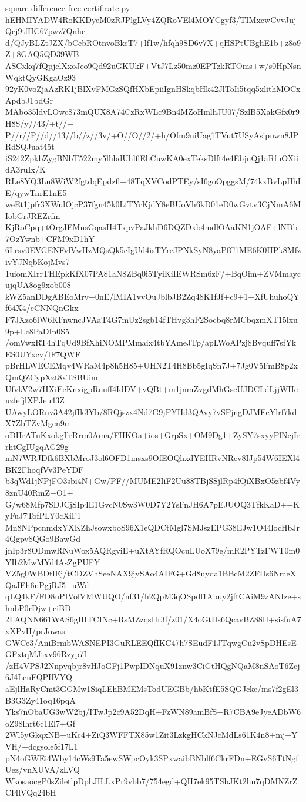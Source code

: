 \documentclass[11pt]{article}
\theoremstyle{definition}
\theoremstyle{remark}
\begin{document}
\begin{filecontents*}[overwrite]{square-difference-free-certificate.py}
hEHMIYADW4RoKKDyeM0zRJPlgLVy4ZQRoVEl4MOYCgyf3/TIMxcwCvvJujQcj9tfHC67pwz7Qnhc
d/QJyBLZtJZX/bCebROtnvoBkcT7+lf1w/hfqh9SD6v7X+qHSPtUBghE1b+z8o9Z+8GAQ5QD39WB
ASCxkq7fQpjclXxoJeo9Qd92uGKUkF+VtJ7Lz50mz0EPTzkRTOms+w/s0HpNsnWqktQyGKgaOz93
92yK0voZjaAzRK1jBlXvFMGzSQfHXbEpiiIgnHSkqbHk42JlToIi5tqq5xlithMOCxApdbJ1bdGr
MAbo35ldvLOwc873mQUX8A74CzRxWLc9Bn4MZoHmlhJU07/SzlB5XakGfx0r9H8S/y//43/+t//+
P//r//P//d//13//b//z//3v/+O//O//2/+h/Ofm9niUag1TVut7USyAsipuwn8JPRdSQJuat45t
iS242ZpkbZygBNbT522my5lhbdUhlfiEhCuwKA0exTeksDlft4e4EbjnQj1aRfuOXiidA3ruIx/K
RLe8YQ3Lu8WiW2fgtdqEpdzfl+48TqXVCodPTEy/sI6goOpggsM/74kxBvLpHhIE/qywTnrE1nE5
weEt1jpfr3XWulOjcP37fgn45k0LfTYrKjdY8eBUoVh6kD01eD0wGvtv3CjNmA6MIobGrJREZrfm
KjRoCpq+tOrgJEMnsGqasH4TxpvPaJkhD6DQZDxb4mdlOAaKN1jOAF+lNDb7OzYwnb+CFM9xD1hY
6Lrsv0EVGENFvlVwHzMQsQk5cIgUd4isTYreJPNkSyN8yaPfC1ME6K0HPk8MfzivYJNqbKojMvs7
1uiomXIrrTHEpkKfX07PA81aN8ZBq0i5TyiKiIEWRSm6zF/+BqOim+ZVMmaycujqUA8og9xob008
kWZ5anDDgABEoMrv+0nE/lMIA1vvOuJblbJB2Zq48K1fJf+c9+1+XfUhuhoQYf64X4/eCNNQnGkx
F7JXzo6lW6KFnwncJVAaT4G7mUz2sgb14fTHvg3hF2Socbq8rMCbqzmXT15lxu9p+Lc8PaDIn0S5
/omVwxRT4hTqUd9BfXhiNOMPMmaix4tbYAmeJTp/apLWoAPzj8Bvquff7sfYkES0UYxcv/IF7QWF
pBrHLWECEMqv4WRaM4p8h5H85+UHN2T4H8Bb5gIqSn7J+7Jg0V5FmB8p2xQmQZCypXzt8xTSBUim
UfvkV2w7HXiEeKnxigpRnuff4IdDV+vQBt+m1jnmZvgdMhGscUJDCLdLjjWHcuzfefjlXPJeu43Z
UAwyLORuv3A42jfIk3Yb/8RQjszx4Nd7G9jPYHd3QAvy7vSPjngDJMEeYlrf7kdX7ZbTZvMgcn9m
oDHrATuKxokgIlrRrm0Ama/FHKOa+ios+GrpSx+OM9Dg1+ZySY7sxyyPlNcjIrrhtCgIUgqAG29g
mN7WRJDfk6BXbMroJ3ol6OFD1msxs9OfEOQhxdYEHRvNRev8IJp54W6IEXl4BK2FhoqfVv3PeYDF
b3qWd1jNPjFO3sbi4N+Gw/PF//MUME2IiF2Uu88TBjSSjlRp4fQiXBxO5zbf4Vy8znU40RmZ+O1+
G/w68Mfp7SDJCjSIp4E1GvcN0Sw3W0D7Y2YsFnJH6A7pEJUOQ3TfkKaD++KyFuJ7TofPLY0cXiF1
Mn8NPpcnmdxYXKZhJsowxboS96X1eQDCtMgl7SMJszEPG38EJw1O44locHbJr4Qgpv8QGo9BawGd
jnIp3r8ODmwRNuWox5AQRgviE+uXtAYfRQOcuLUoX79e/mR2PYTzFWT0m0YIb2MwMYd4AsZgPUFY
VZ5g0WBDtlEj/tCDZVhSeeNAX9jySAo4AIFG+Gd8uyda1BBcM2ZFDs6NmeXQaJEh6nPgjRJ5+uWd
qLQ4kF/FO8uPIVolVMWUQO/nf31/h2QpM3qOSpdl1Abuy2jftCAiM9zANIze+shnbP0rDjw+ciBD
2LAQNN661WAS6gHITCINc+RsMZzqsHr3f/z01/X4oGtHs6QcavBZ88H+sisfuA7xXPvH/prJowas
GWCe3/AniBrmbWASNEPI3GuRLEEQfIKC47h7SEudF1JTqwgCu2vSpDHEsEGFxtqMJtxv96Rzyp7I
/zH4VPSJ2Nnpvqbjr8vHJoGFj1PwpIDNquX91znw3CiGtHQgNQaM8nSAoT6Zcj6J4LcnFQPIlVYQ
aEjlHaRyCmt3GGMw1SiqLEhBMEMsTodUEGBb/hbKtfE5SQGJcke/ms7f2gEl3B3G3Zy41oq16pqA
Yks7nObaUG3wW2bj/ITwJp2c9A52DqH+FzWN89amBfS+R7CBA9eJyeADbW6oZ98lhrt6c1El7+Gf
2Wl5yGkqxNB+uKc4+ZiQ3WFFTX85w1Zit3LzkgHCkNJcMdLs61K4n8+mj+YVH/+dcgsole5f17L1
pN4oGWEi4Wby14cWs9Ta5ewSWpcOyk3SPxwaibBNblf6CkrFDn+EGvS6TtNgfUez/vnXUVA/zLVQ
WkosaocgP0sZiletlpDphJILLxPr9vbb7/754egd+QH7ek95TSbJKt2hn7qDMNZrZCI4lVQq24bH

\end{filecontents*}
\end{document}
